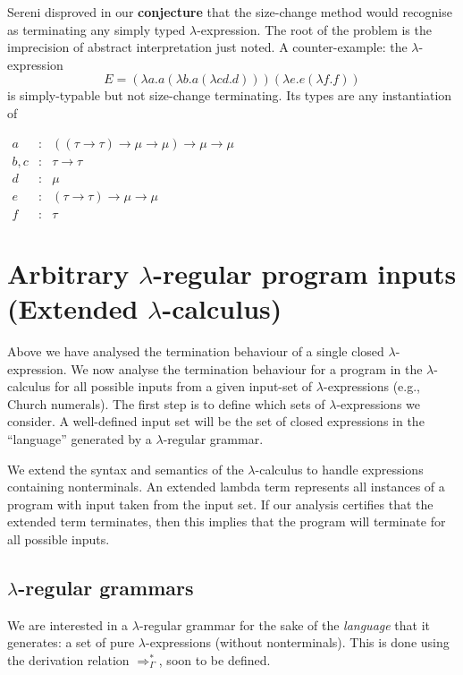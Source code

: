\documentclass{LMCS}
\newcommand{\ba}{\begin{array}}
\newcommand{\ea}{\end{array}}
\theoremstyle{definition}\newtheorem{env}[thm]{Environment}
\begin{document}
Sereni disproved in \cite{sereni2,sereni} our  {\bf conjecture}  that the size-change 
method would recognise as terminating any 
simply typed $\lambda$-expression. The root of the problem is the imprecision of abstract interpretation just noted. A counter-example: the $\lambda$-expression
$$
E = (\lambda a.a(\lambda b.a(\lambda c d.d)))(\lambda e.e(\lambda f.f))
$$
is simply-typable but not size-change terminating. Its types are any
instantiation of \medskip

$\ba{lcl}
a&:&((\tau\to\tau)\to\mu\to\mu)\to\mu\to\mu\\
b,c& : &\tau\to\tau\\
d&:&\mu\\
e&:&(\tau\to\tau)\to\mu\to\mu\\
f&:&\tau
\ea$
\bigskip

\section{Arbitrary $\lambda$-regular program inputs (Extended $\lambda$-calculus)} 
\label{sec-regular-program-inputs}

Above we have analysed the termination behaviour of a single closed $\lambda$-expression. We now analyse the termination behaviour for a program in the $\lambda$-calculus for all possible inputs from a given input-set of $\lambda$-expressions (e.g., Church numerals). The first step is to define which sets of $\lambda$-expressions we consider. A well-defined input set will be the set of closed expressions in the ``language'' generated by a $\lambda$-regular grammar. 

We extend the syntax and semantics of the $\lambda$-calculus to handle expressions containing nonterminals. An extended lambda term represents all instances of a program with input taken from the input set. If our analysis certifies that the extended term terminates, then this implies that the program will terminate for all possible inputs.

\subsection{$\lambda$-regular grammars}

We are interested in a $\lambda$-regular grammar for the sake of the {\em language}  that it generates:
a set of pure $\lambda$-expressions (without nonterminals). This is done using the derivation relation $\Rightarrow^*_\Gamma$, soon to be defined. 
\end{document}
